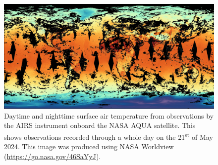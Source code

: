 \begin{figure}[H] 
    \centering
    \includegraphics[width=1.0\linewidth]{figures/snapshot_nasa_airs_aqua_2024_05_21T00_00_00Z.jpg}
    \caption{Daytime and nighttime surface air temperature from observations by the AIRS instrument onboard the NASA AQUA satellite. This shows observations recorded through a whole day on the 21\textsuperscript{st} of May 2024. This image was produced using NASA Worldview (\url{https://go.nasa.gov/46SaYyJ}).}\label{fig:satellite_image_coverage}
\end{figure}

